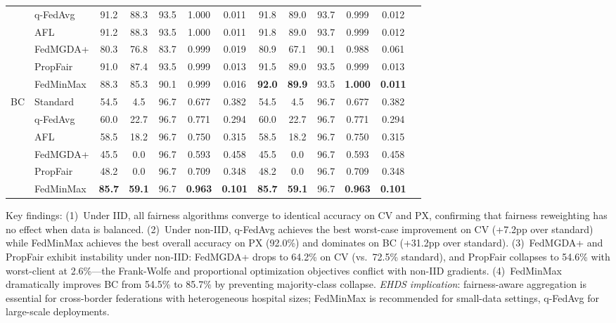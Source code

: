 \documentclass[conference,a4paper]{IEEEtran}
\begin{document}
\begin{table}[htbp]
{\begin{tabular}{llccccccccccc}
 & q-FedAvg & 91.2 & 88.3 & 93.5 & 1.000 & 0.011 & 91.8 & 89.0 & 93.7 & 0.999 & 0.012 \\
 & AFL & 91.2 & 88.3 & 93.5 & 1.000 & 0.011 & 91.8 & 89.0 & 93.7 & 0.999 & 0.012 \\
 & FedMGDA+ & 80.3 & 76.8 & 83.7 & 0.999 & 0.019 & 80.9 & 67.1 & 90.1 & 0.988 & 0.061 \\
 & PropFair & 91.0 & 87.4 & 93.5 & 0.999 & 0.013 & 91.5 & 89.0 & 93.5 & 0.999 & 0.013 \\
 & FedMinMax & 88.3 & 85.3 & 90.1 & 0.999 & 0.016 & \textbf{92.0} & \textbf{89.9} & 93.5 & \textbf{1.000} & \textbf{0.011} \\
\midrule
\multirow{6}{*}{BC} & Standard & 54.5 & 4.5 & 96.7 & 0.677 & 0.382 & 54.5 & 4.5 & 96.7 & 0.677 & 0.382 \\
 & q-FedAvg & 60.0 & 22.7 & 96.7 & 0.771 & 0.294 & 60.0 & 22.7 & 96.7 & 0.771 & 0.294 \\
 & AFL & 58.5 & 18.2 & 96.7 & 0.750 & 0.315 & 58.5 & 18.2 & 96.7 & 0.750 & 0.315 \\
 & FedMGDA+ & 45.5 & 0.0 & 96.7 & 0.593 & 0.458 & 45.5 & 0.0 & 96.7 & 0.593 & 0.458 \\
 & PropFair & 48.2 & 0.0 & 96.7 & 0.709 & 0.348 & 48.2 & 0.0 & 96.7 & 0.709 & 0.348 \\
 & FedMinMax & \textbf{85.7} & \textbf{59.1} & 96.7 & \textbf{0.963} & \textbf{0.101} & \textbf{85.7} & \textbf{59.1} & 96.7 & \textbf{0.963} & \textbf{0.101} \\
\bottomrule
\end{tabular}%
}

\vspace{1mm}
\footnotesize{Key findings: (1)~Under IID, all fairness algorithms converge to identical accuracy on CV and PX, confirming that fairness reweighting has no effect when data is balanced. (2)~Under non-IID, q-FedAvg achieves the best worst-case improvement on CV (+7.2pp over standard) while FedMinMax achieves the best overall accuracy on PX (92.0\%) and dominates on BC (+31.2pp over standard). (3)~FedMGDA+ and PropFair exhibit instability under non-IID: FedMGDA+ drops to 64.2\% on CV (vs.\ 72.5\% standard), and PropFair collapses to 54.6\% with worst-client at 2.6\%---the Frank-Wolfe and proportional optimization objectives conflict with non-IID gradients. (4)~FedMinMax dramatically improves BC from 54.5\% to 85.7\% by preventing majority-class collapse. \textit{EHDS implication}: fairness-aware aggregation is essential for cross-border federations with heterogeneous hospital sizes; FedMinMax is recommended for small-data settings, q-FedAvg for large-scale deployments.}
\end{table}
\end{document}
